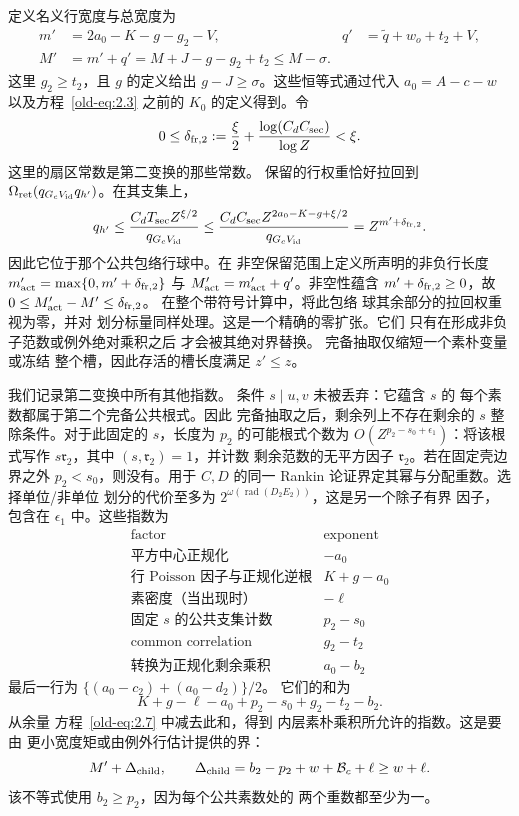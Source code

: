 \documentclass[11pt,a4paper]{article}
\numberwithin{equation}{section}
\numberwithin{figure}{section}
\theoremstyle{definition}
\theoremstyle{remark}
\begin{document}
定义名义行宽度与总宽度为
\begin{equation}
 \begin{aligned}
 m'&=2a_0-K-g-g_2-V,&
 q'&=\widetilde q+w_o+t_2+V,\\
 M'&=m'+q'
    =M+J-g-g_2+t_2
    \le M-\sigma.
 \end{aligned}
 \label{old-eq:2.13}
\end{equation}
这里 \(g_2\ge t_2\)，且 \(g\) 的定义给出
\(g-J\ge\sigma\)。这些恒等式通过代入
\(a_0=A-c-w\) 以及方程~\eqref{old-eq:2.3} 之前的
\(K_0\) 的定义得到。令
\[
 0\le\delta_{{\rm fr},2}:=\frac\xi2+
       \frac{\log(C_dC_{\rm sec})}{\log Z}<\xi.
\]
这里的扇区常数是第二变换的那些常数。
保留的行权重恰好拉回到
\(\Omega_{\rm ret}(q_{G_cV_{\rm id}}q_{h'})\)。在其支集上，
\[
 q_{h'}\le
 \frac{C_dT_{\rm sec}Z^{\xi/2}}{q_{G_cV_{\rm id}}}
 \le\frac{C_dC_{\rm sec}Z^{2a_0-K-g+\xi/2}}
          {q_{G_cV_{\rm id}}}
 =Z^{m'+\delta_{{\rm fr},2}}.
\]
因此它位于那个公共包络行球中。在
非空保留范围上定义所声明的非负行长度
\(m'_{\rm act}=\max\{0,m'+\delta_{{\rm fr},2}\}\) 与
\(M'_{\rm act}=m'_{\rm act}+q'\)。非空性蕴含
\(m'+\delta_{{\rm fr},2}\ge0\)，故
\(0\le M'_{\rm act}-M'\le\delta_{{\rm fr},2}\)。
在整个带符号计算中，将此包络
球其余部分的拉回权重视为零，并对
划分标量同样处理。这是一个精确的零扩张。它们
只有在形成非负子范数或例外绝对乘积之后
才会被其绝对界替换。
完备抽取仅缩短一个素朴变量或冻结
整个槽，因此存活的槽长度满足 \(z'\le z\)。

我们记录第二变换中所有其他指数。
条件 \(s\mid u,v\) 未被丢弃：它蕴含 \(s\) 的
每个素数都属于第二个完备公共根式。因此
完备抽取之后，剩余列上不存在剩余的
\(s\) 整除条件。对于此固定的
\(s\)，长度为 \(p_2\) 的可能根式个数为 \(O(Z^{p_2-s_0+\epsilon_1})\)：将该根式写作
\(s\mathfrak r_2\)，其中 \((s,\mathfrak r_2)=1\)，并计数
剩余范数的无平方因子 \(\mathfrak r_2\)。若在固定壳边界之外
\(p_2<s_0\)，则没有。用于 \(C,D\) 的同一 Rankin
论证界定其幂与分配重数。选择单位/非单位
划分的代价至多为
\(2^{\omega(\operatorname{rad}(D_2E_2))}\)，这是另一个除子有界
因子，包含在 \(\epsilon_1\) 中。这些指数为
\[
 \begin{array}{l|r}
 \text{factor}&\text{exponent}\\ \hline
 \text{平方中心正规化}&-a_0\\
 \text{行 Poisson 因子与正规化逆根}&K+g-a_0\\
 \text{素密度（当出现时）}&-\ell\\
 \text{固定 }s\text{ 的公共支集计数}&p_2-s_0\\
 \text{common correlation}&g_2-t_2\\
 \text{转换为正规化剩余乘积}&a_0-b_2
 \end{array}
\]
最后一行为
\(\{(a_0-c_2)+(a_0-d_2)\}/2\)。
它们的和为
\[
 K+g-\ell-a_0+p_2-s_0+g_2-t_2-b_2.
\]
从余量
方程~\eqref{old-eq:2.7} 中减去此和，得到
内层素朴乘积所允许的指数。这是要由
更小宽度矩或由例外行估计提供的界：
\begin{equation}
 M'+\Delta_{\rm child},\qquad
 \Delta_{\rm child}=b_2-p_2+w+\mathcal B_c+\ell
                   \ge w+\ell.
 \label{old-eq:2.14}
\end{equation}
该不等式使用 \(b_2\ge p_2\)，因为每个公共素数处的
两个重数都至少为一。
\end{document}
